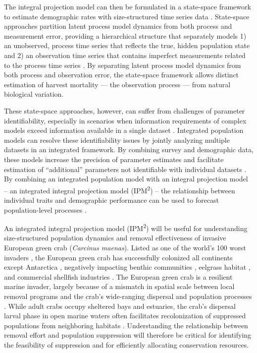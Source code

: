 \documentclass{article}
\begin{document}
The integral projection model can then be formulated in a state-space framework to estimate demographic rates with size-structured time series data \parencite{white2016fitting}. State-space approaches partition latent process model dynamics from both process and measurement error, providing a hierarchical structure that separately models 1) an unobserved, process time series that reflects the true, hidden population state and 2) an observation time series that contains imperfect measurements related to the process time series \parencite{auger2021guide}. By separating latent process model dynamics from both process and observation error, the state-space framework allows distinct estimation of harvest mortality — the observation process — from natural biological variation.

These state-space approaches, however, can suffer from challenges of parameter identifiability, especially in scenarios when information requirements of complex models exceed information available in a single dataset \parencite{auger2016state}. Integrated population models can resolve these identifiability issues by jointly analyzing multiple datasets in an integrated framework. By combining survey and demographic data, these models increase the precision of parameter estimates and facilitate estimation of “additional” parameters not identifiable with individual datasets \parencite{riecke2019integrated, abadi2010assessment}. By combining an integrated population model with an integral projection model – an integrated integral projection model (IPM\textsuperscript{2}) – the relationship between individual traits and demographic performance can be used to forecast population-level processes \parencite{plard2019ipm}.

An integrated integral projection model (IPM\textsuperscript{2}) will be useful for understanding size-structured population dynamics and removal effectiveness of invasive European green crab (\textit{Carcinus maenas}). Listed as one of the world’s 100 worst invaders \parencite{lowe2000100}, the European green crab has successfully colonized all continents except Antarctica \parencite{yamada2001global}, negatively impacting benthic communities \parencite{grosholz2005recent}, eelgrass habitat \parencite{garbary2014drastic, howard2019habitat}, and commercial shellfish industries \parencite{grosholz2011modeling}. The European green crab is a resilient marine invader, largely because of a mismatch in spatial scale between local removal programs and the crab’s wide-ranging dispersal and population processes \parencite{keller2025transition}. While adult crabs occupy sheltered bays and estuaries, the crab’s dispersal larval phase in open marine waters often facilitates recolonization of suppressed populations from neighboring habitats \parencite{yamada2021ocean}. Understanding the relationship between removal effort and population suppression will therefore be critical for identifying the feasibility of suppression and for efficiently allocating conservation resources. 
\end{document}
